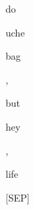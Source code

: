 \documentclass[varwidth=150mm]{standalone}
\begin{document}
\begin{CJK*}{UTF8}{gbsn}
{{{\colorbox{red!0.0}{\strut do}\colorbox{red!1.800347089767456}{\strut uche}\colorbox{red!0.0}{\strut bag} \colorbox{red!0.0}{\strut ,} \colorbox{red!3.162097692489624}{\strut but} \colorbox{red!5.3601460456848145}{\strut hey} \colorbox{red!4.303596019744873}{\strut ,} \colorbox{red!8.70898151397705}{\strut life} \colorbox{red!2.592481851577759}{\strut [SEP]}
}}}
\end{CJK*}
\end{document}
